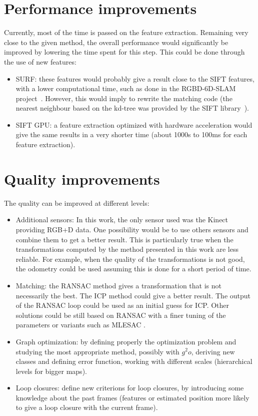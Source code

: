 \section{Performance improvements}

Currently, most of the time is passed on the feature extraction. Remaining very close to the given method, the overall performance would significantly be improved by lowering the time spent for this step. This could be done through the use of new features:
\begin{itemize}
\item SURF: these features would probably give a result close to the SIFT features, with a lower computational time, such as done in the RGBD-6D-SLAM project~\cite{engelhard11euron-workshop}. However, this would imply to rewrite the matching code (the nearest neighbour based on the kd-tree was provided by the SIFT library~\cite{hess_sift}).
\item SIFT GPU: a feature extraction optimized with hardware acceleration would give the same results in a very shorter time (about 1000s to 100ms for each feature extraction).
\end{itemize}

\section{Quality improvements}

The quality can be improved at different levels:
\begin{itemize}
\item Additional sensors: In this work, the only sensor used was the Kinect providing RGB+D data. One possibility would be to use others sensors and combine them to get a better result. This is particularly true when the transformations computed by the method presented in this work are less reliable. For example, when the quality of the transformations is not good, the odometry could be used assuming this is done for a short period of time.
\item Matching: the RANSAC method gives a transformation that is not necessarily the best. The ICP \cite{zhang_92_icp} method could give a better result. The output of the RANSAC loop could be used as an initial guess for ICP. Other solutions could be still based on RANSAC with a finer tuning of the parameters or variants such as MLESAC \cite{TorrZ00}.
\item Graph optimization: by defining properly the optimization problem and studying the most appropriate method, possibly with $g^2o$, deriving new classes and defining error function, working with different scales (hierarchical levels for bigger maps).
\item Loop closures: define new criterions for loop closures, by introducing some knowledge about the past frames (features or estimated position more likely to give a loop closure with the current frame).
\end{itemize}

